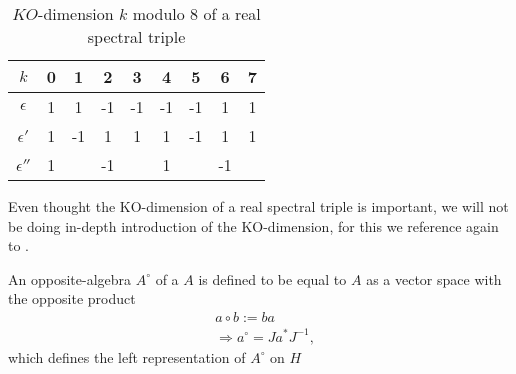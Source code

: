 \begin{table}[h!]
    \centering
    \caption{$KO$-dimension $k$ modulo $8$ of a real spectral triple}
    \begin{tabular}{ c | c c c c c c c c}
        \hline
        $k$        & 0 & 1 & 2 & 3 & 4 & 5 & 6 & 7 \\
        \hline
     $\epsilon$    & 1 & 1 & -1 & -1 & -1 & -1 & 1 & 1 \\
     $\epsilon '$  & 1 & -1 & 1 & 1 & 1 & -1 & 1 & 1 \\
     $\epsilon ''$ & 1 &  & -1 &  & 1 &  & -1 &  \\
     \hline
    \end{tabular}
\end{table}
\noindent
Even thought the KO-dimension of a real spectral triple is important, we will
not be doing in-depth introduction of the KO-dimension, for this we reference
again to \cite{ncgwalter}.

\begin{mydefinition}
An opposite-algebra $A^\circ$ of a $A$ is defined to be equal to $A$ as a
vector space with the opposite product
\begin{align}
    &a\circ b := ba\\
    &\Rightarrow a^\circ = Ja^* J^{-1},
\end{align}
which defines the left representation of $A^\circ$ on $H$
\end{mydefinition}


%

